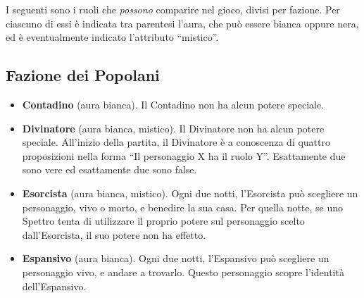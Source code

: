 \documentclass[a4paper,10pt]{article}
\begin{document}
I seguenti sono i ruoli che \emph{possono} comparire nel gioco, divisi per fazione. Per ciascuno di essi è indicata tra parentesi l'aura, che può essere bianca oppure nera, ed è eventualmente indicato l'attributo ``mistico''.


\subsection*{Fazione dei Popolani}

\begin{itemize}
 \item {\bf Contadino} (aura bianca). Il Contadino non ha alcun potere speciale.

 
%  

 \item {\bf Divinatore} (aura bianca, mistico). Il Divinatore non ha alcun potere speciale. All'inizio della partita, il Divinatore è a conoscenza di quattro proposizioni nella forma ``Il personaggio X ha il ruolo Y''. Esattamente due sono vere ed esattamente due sono false.

 \item {\bf Esorcista} (aura bianca, mistico). Ogni due notti, l'Esorcista può scegliere un personaggio, vivo o morto, e benedire la sua casa. Per quella notte, se uno Spettro tenta di utilizzare il proprio potere sul personaggio scelto dall'Esorcista, il suo potere non ha effetto.
 
 
 \item {\bf Espansivo} (aura bianca). Ogni due notti, l'Espansivo può scegliere un personaggio vivo, e andare a trovarlo. Questo personaggio scopre l'identità dell'Espansivo.


\end{itemize}
\end{document}
